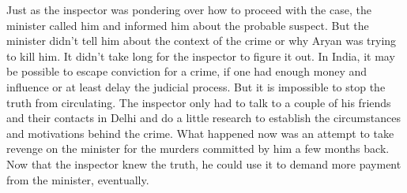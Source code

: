 Just as the inspector was pondering over how to proceed with the case, the
minister called him and informed him about the probable suspect. But the
minister didn't tell him about the context of the crime or why Aryan was trying
to kill him. It didn't take long for the inspector to figure it out. In India,
it may be possible to escape conviction for a crime, if one had enough
money and influence or at least delay the judicial process. But it is impossible
to stop the truth from circulating. The inspector only had to talk to a
couple of his friends and their contacts in Delhi and do a little research to
establish the circumstances and motivations behind the crime. What happened now
was an attempt to take revenge on the minister for the murders committed by him a few
months back. Now that the inspector knew the truth, he could use it to demand
more payment from the minister, eventually.